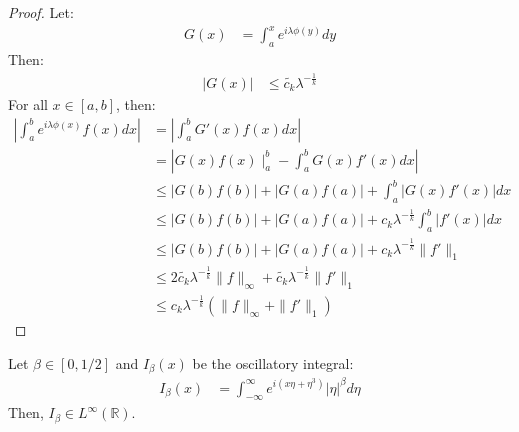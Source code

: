 \begin{proof}{} 
  Let:
  \begin{align*}
    G(x)&=\int_{a}^{x}e^{i\lambda\phi(y)}dy 
  \end{align*}
  Then:
  \begin{align*}
    |G(x)|&\leq \tilde{c_k}\lambda^{-\frac{1}{k}} 
  \end{align*}
  For all $x\in[a,b]$, then:
  \begin{align*}
    \left|\int_{a}^{b}e^{i\lambda\phi(x)}f(x)dx\right|&=\left|\int_{a}^{b}G'(x)f(x)dx\right|\\
    &=\left|G(x)f(x)\mid_{a}^{b}-\int_{a}^{b}G(x)f'(x)dx\right|\\
    &\leq\left|G(b)f(b)\right|+\left|G(a)f(a)\right|+\int_{a}^{b}\left|G(x)f'(x)\right|dx\\
    &\leq\left|G(b)f(b)\right|+\left|G(a)f(a)\right|+c_k\lambda^{-\frac{1}{k}}\int_{a}^{b}\left|f'(x)\right|dx\\
    &\leq\left|G(b)f(b)\right|+\left|G(a)f(a)\right|+c_k\lambda^{-\frac{1}{k}}\|f'\|_{1}\\
    &\leq 2\tilde{c_k}\lambda^{-\frac{1}{k}}\|f\|_{\infty}+\tilde{c_k}\lambda^{-\frac{1}{k}}\|f'\|_{1}\\
    &\leq c_k\lambda^{-\frac{1}{k}}(\|f\|_{\infty}+\|f'\|_{1})
  \end{align*}
\end{proof}
\begin{proposition}{}
  Let $\beta\in [0,1/2]$ and $I_{\beta}(x)$ be the oscillatory integral:
  \begin{align*}
    I_{\beta}(x)&=\int_{-\infty}^{\infty}e^{i(x\eta+\eta^3)}|\eta|^{\beta}d\eta
  \end{align*}
  Then, $I_{\beta}\in L^{\infty}(\mathbb{R})$.
\end{proposition}
